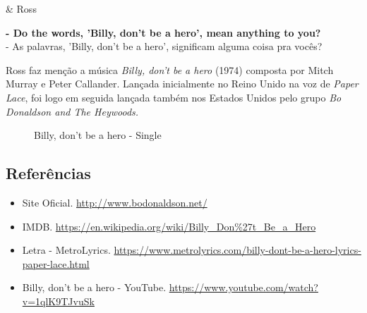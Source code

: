 \begin{tcolorbox}[enhanced,center upper,
    drop fuzzy shadow southeast, boxrule=0.3pt,
    lower separated=false,
    colframe=black!30!dialogoBorder,colback=white]
\begin{minipage}[c]{0.14\linewidth}
   & \centering \scriptsize{Ross}
\end{minipage}
\hspace{.1mm}
\begin{minipage}[c]{0.8\linewidth}
  \textbf{- Do the words, 'Billy, don't be a hero', mean anything to you?}\\
  - As palavras, 'Billy, don't be a hero', significam alguma coisa pra vocês?
\end{minipage}
\end{tcolorbox}

Ross faz menção a música \emph{Billy, don't be a hero} (1974) composta
por Mitch Murray e Peter Callander. Lançada inicialmente no Reino Unido
na voz de \emph{Paper Lace}, foi logo em seguida lançada também nos
Estados Unidos pelo grupo \emph{Bo Donaldson and The Heywoods.}

\begin{figure}
  \centering
    \caption{Billy, don’t be a hero - Single\label{fig:billy-don-t-be-a-hero-single}}
\end{figure}

\hypertarget{referuxeancias-6}{%
\subsection{Referências}\label{referuxeancias-6}}

\begin{itemize}
\tightlist
\item
  \sloppy Site Oficial. \url{http://www.bodonaldson.net/}
\item
  \sloppy IMDB. \url{https://en.wikipedia.org/wiki/Billy_Don%27t_Be_a_Hero}
\item
  \sloppy Letra - MetroLyrics. \url{https://www.metrolyrics.com/billy-dont-be-a-hero-lyrics-paper-lace.html}
\item
  \sloppy Billy, don’t be a hero - YouTube. \url{https://www.youtube.com/watch?v=1qlK9TJvuSk}
\end{itemize}

